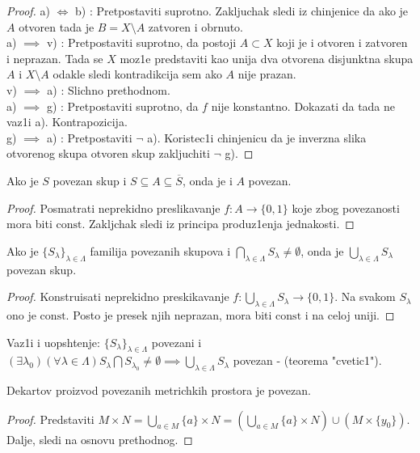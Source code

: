 \documentclass[a4paper,12pt]{article}
\newcommand{\psj}{\subseteq}
\newcommand{\const}{\mathrm{const}}
\begin{document}
\begin{proof}
a) $\Leftrightarrow$ b) : Pretpostaviti suprotno. Zakljuchak sledi iz chinjenice da ako je $A$ otvoren tada je $B = X \setminus A$ zatvoren i obrnuto. \\ 
a) $\implies$ v) : Pretpostaviti suprotno, da postoji $A \subset X$ koji je i otvoren i zatvoren i neprazan. Tada se $X$ moz1e predstaviti kao unija dva otvorena disjunktna skupa $A$ i $X \setminus A$ odakle sledi kontradikcija sem ako $A$ nije prazan.
\\ 
v) $\implies$ a) : Slichno prethodnom.
\\
a) $\implies$ g) : Pretpostaviti suprotno, da $f$ nije konstantno. Dokazati da tada ne vaz1i a). Kontrapozicija.
\\
g) $\implies$ a) : Pretpostaviti $\neg$ a). Koristec1i chinjenicu da je inverzna slika otvorenog skupa otvoren skup zakljuchiti $\neg$ g).
\end{proof}

\begin{tvr}
Ako je $S$ povezan skup i $S \psj A \psj \overline{S}$, onda je i $A$ povezan.
\end{tvr}
\begin{proof}
Posmatrati neprekidno preslikavanje $f: A \to \{0, 1\}$ koje zbog povezanosti mora biti $\const$. Zakljchak sledi iz principa produz1enja jednakosti.
\end{proof}

\begin{tvr}
Ako je $\{S_{\lambda}\}_{\lambda \in \Lambda}$ familija povezanih skupova i $\bigcap_{\lambda \in \Lambda} S_{\lambda} \ne \emptyset$, onda je $\bigcup_{\lambda \in \Lambda} S_{\lambda}$ povezan skup.
\end{tvr}
\begin{proof}
Konstruisati neprekidno preskikavanje $f: \bigcup_{\lambda \in \Lambda} S_{\lambda} \to \{ 0, 1 \}$. Na svakom $S_\lambda$ ono je $\const$. Posto je presek njih neprazan, mora biti $\const$ i na celoj uniji.
\end{proof}

\begin{nap}
Vaz1i i uopshtenje: $\{S_{\lambda}\}_{\lambda \in \Lambda}$ povezani i $(\exists \lambda_0) (\forall \lambda \in \Lambda) S_{\lambda} \bigcap S_{\lambda_0} \ne \emptyset \implies \bigcup_{\lambda \in \Lambda} S_{\lambda}$ povezan - (teorema "cvetic1").
\end{nap}

\begin{posl}
Dekartov proizvod povezanih metrichkih prostora je povezan.
\end{posl}
\begin{proof}
Predstaviti $M \times N = \bigcup_{a\in M} \{a\} \times N = (\bigcup_{a\in M} \{a\} \times N) \cup
(M \times  \{y_0\})$. Dalje, sledi na osnovu prethodnog.
\end{proof}
\end{document}
